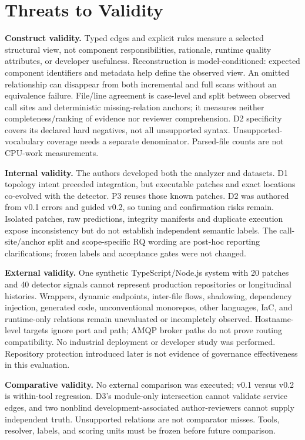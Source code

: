 \documentclass[conference]{IEEEtran}
\begin{document}
\section{Threats to Validity}

\textbf{Construct validity.}
Typed edges and explicit rules measure a selected structural view, not component responsibilities, rationale, runtime quality attributes, or developer usefulness. Reconstruction is model-conditioned: expected component identifiers and metadata help define the observed view. An omitted relationship can disappear from both incremental and full scans without an equivalence failure. File/line agreement is case-level and split between observed call sites and deterministic missing-relation anchors; it measures neither completeness/ranking of evidence nor reviewer comprehension. D2 specificity covers its declared hard negatives, not all unsupported syntax. Unsupported-vocabulary coverage needs a separate denominator. Parsed-file counts are not CPU-work measurements.

\textbf{Internal validity.}
The authors developed both the analyzer and datasets. D1 topology intent preceded integration, but executable patches and exact locations co-evolved with the detector. P3 reuses those known patches. D2 was authored from v0.1 errors and guided v0.2, so tuning and confirmation risks remain. Isolated patches, raw predictions, integrity manifests and duplicate execution expose inconsistency but do not establish independent semantic labels. The call-site/anchor split and scope-specific RQ wording are post-hoc reporting clarifications; frozen labels and acceptance gates were not changed.

\textbf{External validity.}
One synthetic TypeScript/Node.js system with 20 patches and 40 detector signals cannot represent production repositories or longitudinal histories. Wrappers, dynamic endpoints, inter-file flows, shadowing, dependency injection, generated code, unconventional monorepos, other languages, IaC, and runtime-only relations remain unevaluated or incompletely observed. Hostname-level targets ignore port and path; AMQP broker paths do not prove routing compatibility. No industrial deployment or developer study was performed. Repository protection introduced later is not evidence of governance effectiveness in this evaluation.

\textbf{Comparative validity.}
No external comparison was executed; v0.1 versus v0.2 is within-tool regression. D3's module-only intersection cannot validate service edges, and two nonblind development-associated author-reviewers cannot supply independent truth. Unsupported relations are not comparator misses. Tools, resolver, labels, and scoring units must be frozen before future comparison.
\end{document}
